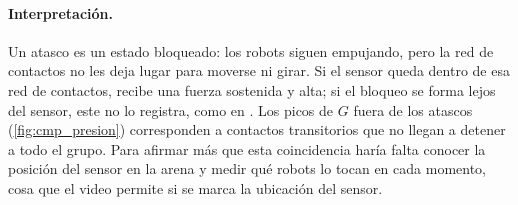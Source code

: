 \paragraph{Interpretación.} Un atasco es un estado bloqueado: los robots siguen empujando, pero la red
de contactos no les deja lugar para moverse ni girar. Si el sensor queda dentro de esa red de
contactos, recibe una fuerza sostenida y alta; si el bloqueo se forma lejos del sensor, este no lo
registra, como en . Los picos de $G$ fuera de los atascos (\cref{fig:cmp_presion})
corresponden a contactos transitorios que no llegan a detener a todo el grupo. Para afirmar más que
esta coincidencia haría falta conocer la posición del sensor en la arena y medir qué robots lo
tocan en cada momento, cosa que el video permite si se marca la ubicación del sensor.
